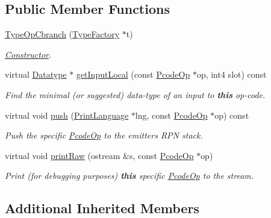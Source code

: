 \subsection*{Public Member Functions}
\begin{DoxyCompactItemize}
\item 
\mbox{\hyperlink{class_type_op_cbranch_a7f2f5a58e7cc4f539d3c2f5643226a30}{Type\+Op\+Cbranch}} (\mbox{\hyperlink{class_type_factory}{Type\+Factory}} $\ast$t)
\begin{DoxyCompactList}\small\item\em \mbox{\hyperlink{class_constructor}{Constructor}}. \end{DoxyCompactList}\item 
virtual \mbox{\hyperlink{class_datatype}{Datatype}} $\ast$ \mbox{\hyperlink{class_type_op_cbranch_af7d6764f79c316780136fab4e67b8a3f}{get\+Input\+Local}} (const \mbox{\hyperlink{class_pcode_op}{Pcode\+Op}} $\ast$op, int4 slot) const
\begin{DoxyCompactList}\small\item\em Find the minimal (or suggested) data-\/type of an input to {\bfseries{this}} op-\/code. \end{DoxyCompactList}\item 
virtual void \mbox{\hyperlink{class_type_op_cbranch_a5798175bf1004bd4af848b14e6e0b46c}{push}} (\mbox{\hyperlink{class_print_language}{Print\+Language}} $\ast$lng, const \mbox{\hyperlink{class_pcode_op}{Pcode\+Op}} $\ast$op) const
\begin{DoxyCompactList}\small\item\em Push the specific \mbox{\hyperlink{class_pcode_op}{Pcode\+Op}} to the emitter\textquotesingle{}s R\+PN stack. \end{DoxyCompactList}\item 
virtual void \mbox{\hyperlink{class_type_op_cbranch_acaea1b1ce2d5cce9753e658fb69cb1f4}{print\+Raw}} (ostream \&s, const \mbox{\hyperlink{class_pcode_op}{Pcode\+Op}} $\ast$op)
\begin{DoxyCompactList}\small\item\em Print (for debugging purposes) {\bfseries{this}} specific \mbox{\hyperlink{class_pcode_op}{Pcode\+Op}} to the stream. \end{DoxyCompactList}\end{DoxyCompactItemize}
\subsection*{Additional Inherited Members}



